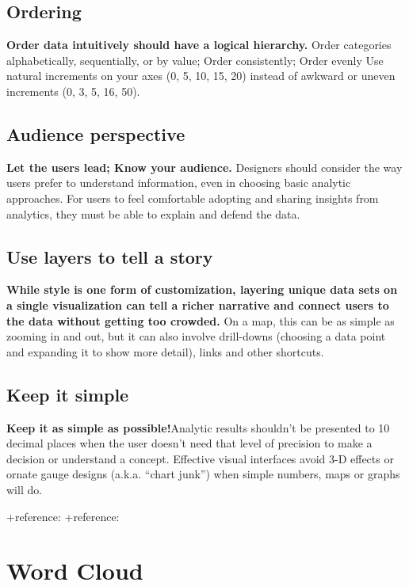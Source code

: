 \documentclass[]{book}
\theoremstyle{definition}
\theoremstyle{definition}
\theoremstyle{definition}
\theoremstyle{remark}
\begin{document}
\subsection{Ordering}\label{ordering-1}

\textbf{Order data intuitively should have a logical hierarchy.} Order
categories alphabetically, sequentially, or by value; Order
consistently; Order evenly Use natural increments on your axes (0, 5,
10, 15, 20) instead of awkward or uneven increments (0, 3, 5, 16, 50).

\subsection{Audience perspective}\label{audience-perspective-1}

\textbf{Let the users lead; Know your audience.} Designers should
consider the way users prefer to understand information, even in
choosing basic analytic approaches. For users to feel comfortable
adopting and sharing insights from analytics, they must be able to
explain and defend the data.

\subsection{Use layers to tell a
story}\label{use-layers-to-tell-a-story-1}

\textbf{While style is one form of customization, layering unique data
sets on a single visualization can tell a richer narrative and connect
users to the data without getting too crowded.} On a map, this can be as
simple as zooming in and out, but it can also involve drill-downs
(choosing a data point and expanding it to show more detail), links and
other shortcuts.

\subsection{Keep it simple}\label{keep-it-simple-2}

\textbf{Keep it as simple as possible!}Analytic results shouldn't be
presented to 10 decimal places when the user doesn't need that level of
precision to make a decision or understand a concept. Effective visual
interfaces avoid 3-D effects or ornate gauge designs (a.k.a. ``chart
junk'') when simple numbers, maps or graphs will do.

+reference: \citep{French} +reference: \citep{Steier}

\section{Word Cloud}\label{word-cloud}
\end{document}
